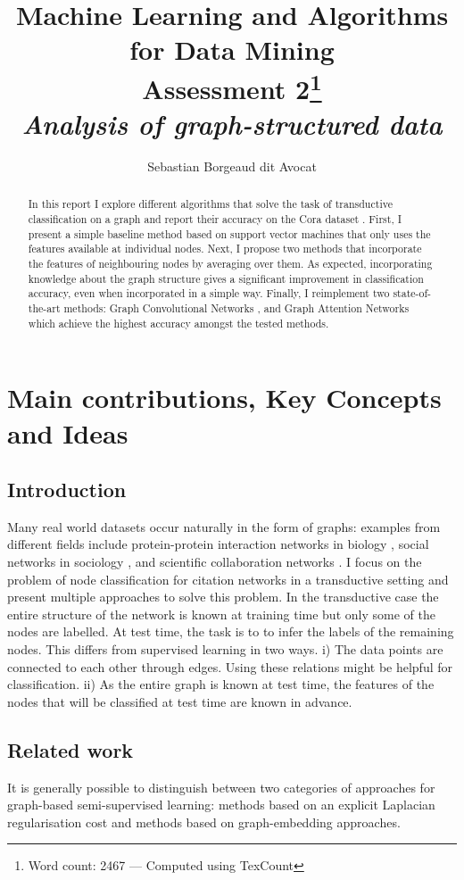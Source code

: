 \documentclass[12pt]{article}
\title{{\small{Machine Learning and Algorithms for Data Mining} \\
Assessment 2\footnote{Word count: 2467 --- Computed using TexCount}} \\
\textit{Analysis of graph-structured data}}
\author{Sebastian Borgeaud dit Avocat}
\theoremstyle{definition}
\begin{document}
\maketitle

\begin{abstract}
	In this report I explore different algorithms that solve the task of transductive classification on a graph and report their accuracy on the Cora dataset \cite{cora}. First, I present a simple baseline method based on support vector machines that only uses the features available at individual nodes. Next, I propose two methods that incorporate the features of neighbouring nodes by averaging over them. As expected, incorporating knowledge about the graph structure gives a significant improvement in classification accuracy, even when incorporated in a simple way. Finally, I reimplement two state-of-the-art methods: Graph Convolutional Networks \cite{kipf2017semi}, and Graph Attention Networks \cite{velickovic2018graph} which achieve the highest accuracy amongst the tested methods.
\end{abstract}

\section{Main contributions, Key Concepts and Ideas}
\subsection{Introduction}
Many real world datasets occur naturally in the form of graphs: examples from different fields include protein-protein interaction networks in biology \cite{schwikowski2000network}, social networks in sociology \cite{otte2002social}, and scientific collaboration networks \cite{newman2001structure}. I focus on the problem of node classification for citation networks in a transductive setting and present multiple approaches to solve this problem. In the transductive case the entire structure of the network is known at training time but only some of the nodes are labelled. At test time, the task is to to infer the labels of the remaining nodes. This differs from supervised learning in two ways. i) The data points are connected to each other through edges. Using these relations might be helpful for classification. ii) As the entire graph is known at test time, the features of the nodes that will be classified at test time are known in advance. 

\subsection{Related work}
It is generally possible to distinguish between two categories of approaches for graph-based semi-supervised learning: methods based on an explicit Laplacian regularisation cost and methods based on graph-embedding approaches.
\end{document}
